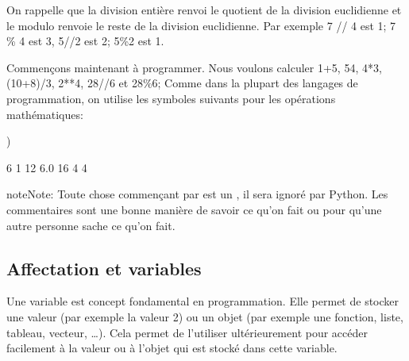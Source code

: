 \documentclass[letterpaper,10pt,french]{sphinxmanual}
\begin{document}
\sphinxAtStartPar
On rappelle que la division entière renvoi le quotient de la division euclidienne et le modulo renvoie le reste de la division euclidienne. Par exemple 7 // 4 est 1; 7 \% 4 est 3, 5//2 est 2; 5\%2 est 1.

\sphinxAtStartPar
Commençons maintenant à programmer. Nous voulons calculer 1+5, 5\sphinxhyphen{}4, 4*3, (10+8)/3, 2**4, 28//6 et 28\%6;
Comme dans la plupart des langages de programmation, on utilise les symboles suivants pour les opérations mathématiques:

\begin{sphinxVerbatim}[commandchars=\\\{\}]






)
\end{sphinxVerbatim}

\begin{sphinxVerbatim}[commandchars=\\\{\}]
6
1
12
6.0
16
4
4
\end{sphinxVerbatim}

\begin{sphinxadmonition}{note}{Note:}
\sphinxAtStartPar
Toute chose commençant par \sphinxcode{\sphinxupquote{\#}} est un , il sera ignoré par Python. Les commentaires sont une bonne manière de savoir ce qu’on fait ou pour qu’une autre personne sache ce qu’on fait.
\end{sphinxadmonition}


\subsection{Affectation et variables}
\label{\detokenize{ch1:affectation-et-variables}}
\sphinxAtStartPar
Une variable est concept fondamental en programmation. Elle permet de stocker une valeur (par exemple la valeur 2) ou un objet (par exemple une fonction, liste, tableau, vecteur, …). Cela permet de l’utiliser ultérieurement pour accéder facilement à la valeur ou à l’objet qui est stocké dans cette variable.
\end{document}
